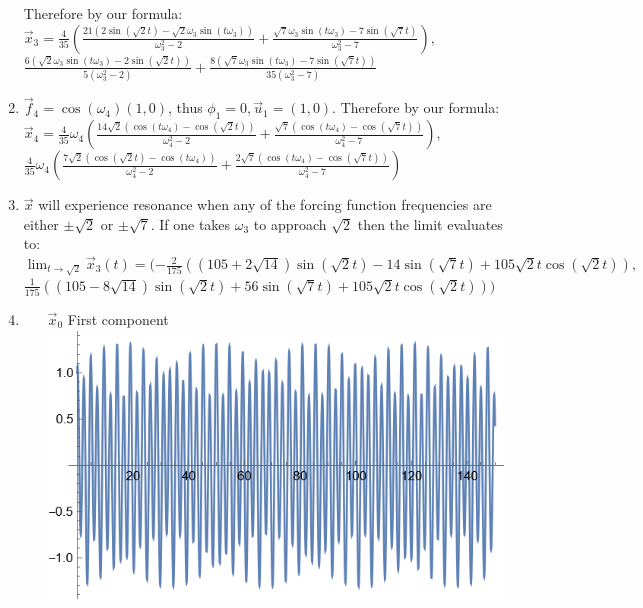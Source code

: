 \documentclass[12pt, letterpaper]{article}
\begin{document}
\begin{enumerate}
    Therefore by our formula:\\
    $
	\Vec{x}_3 = \frac{4}{35} \left(\frac{21 \left(2 \sin \left(\sqrt{2} t\right)-\sqrt{2}
   \omega_3 \sin (t \omega_3)\right)}{\omega_3^2-2}+\frac{\sqrt{7} \omega_3 \sin (t \omega_3)-7 \sin
   \left(\sqrt{7} t\right)}{\omega_3^2-7}\right),$\\
   $\frac{6 \left(\sqrt{2}
   \omega_3 \sin (t \omega_3)-2 \sin \left(\sqrt{2}
   t\right)\right)}{5 \left(\omega_3^2-2\right)}+\frac{8 \left(\sqrt{7}
   \omega_3 \sin (t \omega_3)-7 \sin \left(\sqrt{7}
   t\right)\right)}{35 \left(\omega_3^2-7\right)}
    $
    \item  $\Vec{f}_4 = \cos(\omega_4)(1,0)$, thus $\phi_1 = 0, \Vec{u}_1 = (1,0)$.  Therefore by our formula:\\
    $\Vec{x}_4 = \frac{4}{35} \omega_4 \left(\frac{14 \sqrt{2} \left(\cos (t
   \omega_4)-\cos \left(\sqrt{2} t\right)\right)}{\omega_4^2-2}+\frac{\sqrt{7} \left(\cos (t \omega_4)-\cos \left(\sqrt{7}
   t\right)\right)}{\omega_4^2-7}\right),$\\
   $\frac{4}{35} \omega_4
   \left(\frac{7 \sqrt{2} \left(\cos \left(\sqrt{2} t\right)-\cos (t \omega_4)\right)}{\omega_4^2-2}+\frac{2 \sqrt{7} \left(\cos (t
   \omega_4)-\cos \left(\sqrt{7} t\right)\right)}{\omega_4^2-7}\right)$
   \item $\Vec{x}$ will experience resonance when any of the forcing function frequencies are either $\pm \sqrt{2}$ or $\pm \sqrt{7}$.  If one takes $\omega_3 $ to approach $ \sqrt{2}$ then the limit evaluates to: \\
   $
	\lim_{t \to \sqrt{2}} \Vec{x}_3 (t) = (-\frac{2}{175} \left(\left(105+2 \sqrt{14}\right) \sin \left(\sqrt{2}
   t\right)-14 \sin \left(\sqrt{7} t\right)+105 \sqrt{2} t \cos \left(\sqrt{2}
   t\right)\right),$\\
   $\frac{1}{175} \left(\left(105-8 \sqrt{14}\right) \sin
   \left(\sqrt{2} t\right)+56 \sin \left(\sqrt{7} t\right)+105 \sqrt{2} t \cos
   \left(\sqrt{2} t\right)\right))  
   $
   \item 
   \begin{enumerate}
		\item[$\Vec{x}_0$] First component\\
		\includegraphics[scale=1.0]{x0com1.png}\\

\end{enumerate}
\end{enumerate}
\end{document}
